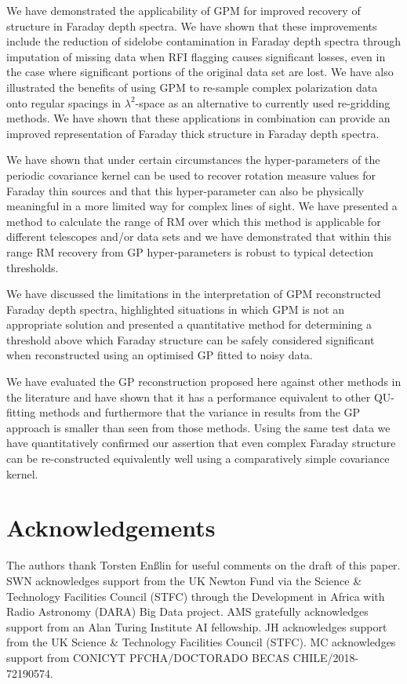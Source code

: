\documentclass[fleqn,usenatbib]{mnras}
\begin{document}
We have demonstrated the applicability of GPM for improved recovery of structure in Faraday depth spectra. We have shown that these improvements include the reduction of sidelobe contamination in Faraday depth spectra through imputation of missing data when RFI flagging causes significant losses, even in the case where significant portions of the original data set are lost. We have also illustrated the benefits of using GPM to re-sample complex polarization data onto regular spacings in $\lambda^2$-space as an alternative to currently used re-gridding methods. We have shown that these applications in combination can provide an improved representation of Faraday thick structure in Faraday depth spectra.

We have shown that under certain circumstances the hyper-parameters of the periodic covariance kernel can be used to recover rotation measure values for Faraday thin sources and that this hyper-parameter can also be physically meaningful in a more limited way for complex lines of sight. We have presented a method to calculate the range of RM over which this method is applicable for different telescopes and/or data sets and we have demonstrated that within this range RM recovery from GP hyper-parameters is robust to typical detection thresholds.


We have discussed the limitations in the interpretation of GPM reconstructed Faraday depth spectra, highlighted situations in which GPM is not an appropriate solution and presented a quantitative method for determining a threshold above which Faraday structure can be safely considered significant when reconstructed using an optimised GP fitted to noisy data.

We have evaluated the GP reconstruction proposed here against other methods in the literature and have shown that it has a performance equivalent to other QU-fitting methods and furthermore that the variance in results from the GP approach is smaller than seen from those methods. Using the same test data we have quantitatively confirmed our assertion that even complex Faraday structure can be re-constructed equivalently well using a comparatively simple covariance kernel.


\section*{Acknowledgements}

The authors thank Torsten En{\ss}lin for useful comments on the draft of this paper. SWN acknowledges support from the UK Newton Fund via the Science \& Technology Facilities Council (STFC) through the Development in Africa with Radio Astronomy (DARA) Big Data project. AMS gratefully acknowledges support from an Alan Turing Institute AI fellowship. JH acknowledges support from the UK Science \& Technology Facilities Council (STFC). MC acknowledges support from CONICYT PFCHA/DOCTORADO BECAS CHILE/2018-72190574.
\end{document}
